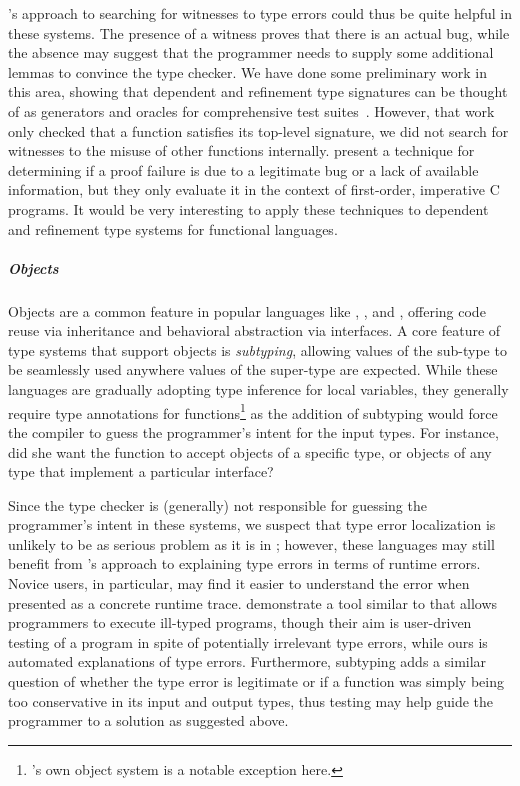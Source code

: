 's approach to searching for witnesses to type errors
could thus be quite helpful in these systems.
%
The presence of a witness proves that there is an actual bug, while the
absence may suggest that the programmer needs to supply some additional
lemmas to convince the type checker.
%
We have done some preliminary work in this area, showing that dependent
and refinement type signatures can be thought of as generators and
oracles for comprehensive test suites~\citep{Seidel2015-pe}.
%
However, that work only checked that a function satisfies its top-level
signature, we did not search for witnesses to the misuse of other
functions internally.
%
\citet{Petiot2016-fe} present a technique for determining if a proof
failure is due to a legitimate bug or a lack of available information,
but they only evaluate it in the context of first-order, imperative C
programs.
%
It would be very interesting to apply these techniques to dependent
and refinement type systems for functional languages.

\subparagraph{Objects}
%
Objects are a common feature in popular languages like ,
, and , offering code reuse via inheritance and
behavioral abstraction via interfaces.
%
A core feature of type systems that support objects is \emph{subtyping},
allowing values of the sub-type to be seamlessly used anywhere values of
the super-type are expected.
%
While these languages are gradually adopting type inference for local
variables, they generally require type annotations for
functions\footnote{\ocaml's own object system is a notable exception
  here.} as the addition of subtyping would force the compiler to guess
the programmer's intent for the input types.
%
For instance, did she want the function to accept objects of a specific
type, or objects of any type that implement a particular interface?

Since the type checker is (generally) not responsible for guessing the
programmer's intent in these systems, we suspect that type error
localization is unlikely to be as serious problem as it is in \ocaml;
however, these languages may still benefit from 's
approach to explaining type errors in terms of runtime errors.
%
Novice users, in particular, may find it easier to understand the error
when presented as a concrete runtime trace.
%
\citet{Bayne2011-cn} demonstrate a tool similar to  that
allows programmers to execute ill-typed  programs, though
their aim is user-driven testing of a program in spite of potentially
irrelevant type errors, while ours is automated explanations of
type errors.
%
Furthermore, subtyping adds a similar question of whether the type error
is legitimate or if a function was simply being too conservative in its
input and output types, thus testing may help guide the programmer to a
solution as suggested above.

